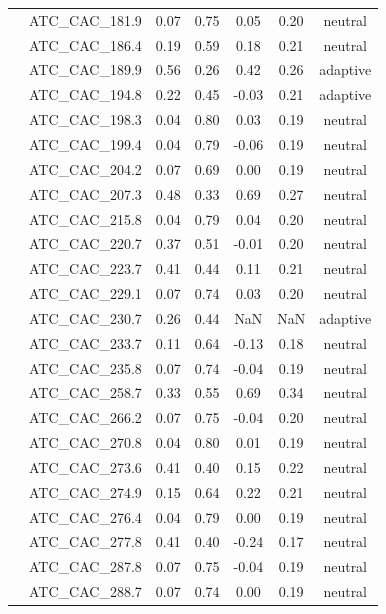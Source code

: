 \documentclass[11pt,]{article}
\begin{document}
\begin{longtable}[c]{@{}lcccccc@{}}
& ATC\_CAC\_181.9 & 0.07 & 0.75 & 0.05 & 0.20 & neutral
\\\addlinespace
& ATC\_CAC\_186.4 & 0.19 & 0.59 & 0.18 & 0.21 & neutral
\\\addlinespace
& ATC\_CAC\_189.9 & 0.56 & 0.26 & 0.42 & 0.26 & adaptive
\\\addlinespace
& ATC\_CAC\_194.8 & 0.22 & 0.45 & -0.03 & 0.21 & adaptive
\\\addlinespace
& ATC\_CAC\_198.3 & 0.04 & 0.80 & 0.03 & 0.19 & neutral
\\\addlinespace
& ATC\_CAC\_199.4 & 0.04 & 0.79 & -0.06 & 0.19 & neutral
\\\addlinespace
& ATC\_CAC\_204.2 & 0.07 & 0.69 & 0.00 & 0.19 & neutral
\\\addlinespace
& ATC\_CAC\_207.3 & 0.48 & 0.33 & 0.69 & 0.27 & neutral
\\\addlinespace
& ATC\_CAC\_215.8 & 0.04 & 0.79 & 0.04 & 0.20 & neutral
\\\addlinespace
& ATC\_CAC\_220.7 & 0.37 & 0.51 & -0.01 & 0.20 & neutral
\\\addlinespace
& ATC\_CAC\_223.7 & 0.41 & 0.44 & 0.11 & 0.21 & neutral
\\\addlinespace
& ATC\_CAC\_229.1 & 0.07 & 0.74 & 0.03 & 0.20 & neutral
\\\addlinespace
& ATC\_CAC\_230.7 & 0.26 & 0.44 & NaN & NaN & adaptive
\\\addlinespace
& ATC\_CAC\_233.7 & 0.11 & 0.64 & -0.13 & 0.18 & neutral
\\\addlinespace
& ATC\_CAC\_235.8 & 0.07 & 0.74 & -0.04 & 0.19 & neutral
\\\addlinespace
& ATC\_CAC\_258.7 & 0.33 & 0.55 & 0.69 & 0.34 & neutral
\\\addlinespace
& ATC\_CAC\_266.2 & 0.07 & 0.75 & -0.04 & 0.20 & neutral
\\\addlinespace
& ATC\_CAC\_270.8 & 0.04 & 0.80 & 0.01 & 0.19 & neutral
\\\addlinespace
& ATC\_CAC\_273.6 & 0.41 & 0.40 & 0.15 & 0.22 & neutral
\\\addlinespace
& ATC\_CAC\_274.9 & 0.15 & 0.64 & 0.22 & 0.21 & neutral
\\\addlinespace
& ATC\_CAC\_276.4 & 0.04 & 0.79 & 0.00 & 0.19 & neutral
\\\addlinespace
& ATC\_CAC\_277.8 & 0.41 & 0.40 & -0.24 & 0.17 & neutral
\\\addlinespace
& ATC\_CAC\_287.8 & 0.07 & 0.75 & -0.04 & 0.19 & neutral
\\\addlinespace
& ATC\_CAC\_288.7 & 0.07 & 0.74 & 0.00 & 0.19 & neutral

\end{longtable}
\end{document}
